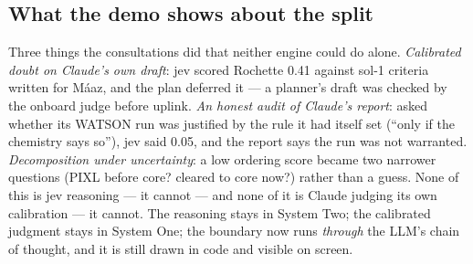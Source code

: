 \documentclass[11pt]{article}
\begin{document}
\subsection{What the demo shows about the split}
Three things the consultations did that neither engine could do alone. \emph{Calibrated doubt on Claude's own draft}: jev scored Rochette 0.41 against sol-1 criteria written for M\'aaz, and the plan deferred it --- a planner's draft was checked by the onboard judge before uplink. \emph{An honest audit of Claude's report}: asked whether its WATSON run was justified by the rule it had itself set (``only if the chemistry says so''), jev said 0.05, and the report says the run was not warranted. \emph{Decomposition under uncertainty}: a low ordering score became two narrower questions (PIXL before core? cleared to core now?) rather than a guess. None of this is jev reasoning --- it cannot --- and none of it is Claude judging its own calibration --- it cannot. The reasoning stays in System Two; the calibrated judgment stays in System One; the boundary now runs \emph{through} the LLM's chain of thought, and it is still drawn in code and visible on screen.
\end{document}
